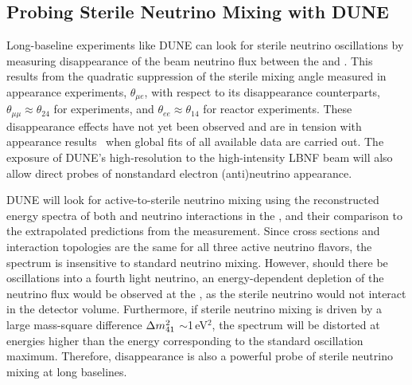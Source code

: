 \subsection{Probing Sterile Neutrino Mixing with DUNE}

Long-baseline experiments like DUNE can look for sterile neutrino oscillations by measuring disappearance of the beam neutrino flux between the  and . This results from the quadratic suppression of the sterile mixing angle measured in appearance experiments, $\theta_{\mu e}$, with respect to its disappearance counterparts, $\theta_{\mu\mu}\approx\theta_{24}$ for  experiments, and $\theta_{ee}\approx\theta_{14}$ for reactor experiments. These disappearance effects have not yet been observed and are in tension with appearance results~\cite{ref:tension,Gariazzo:2017fdh} when global fits of all available data are carried out. The exposure of DUNE's high-resolution  to the high-intensity LBNF beam will also allow direct probes of nonstandard electron (anti)neutrino appearance. 

DUNE will look for active-to-sterile neutrino mixing using the reconstructed energy spectra of both  and   neutrino interactions  in the , and their comparison to the extrapolated predictions from the  measurement. Since  cross sections and interaction topologies are the same for all three active neutrino flavors, the  spectrum is insensitive to standard neutrino mixing. However, should there be oscillations into a fourth light neutrino, an energy-dependent depletion of the neutrino flux would be observed at the , as the sterile neutrino would not interact in the detector volume. Furthermore, if sterile neutrino mixing is driven by a large mass-square difference $\Delta m^2_{\rm{41}}$ $\sim$1\,eV$^{2}$, the  spectrum will be distorted at energies higher than the energy corresponding to the standard oscillation maximum. Therefore,  disappearance is also a powerful probe of sterile neutrino mixing at long baselines. 


